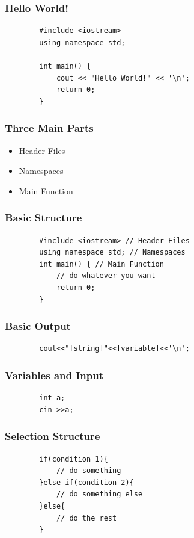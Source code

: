 \documentclass[xcolor=dvipsnames]{beamer}
\begin{document}
    \begin{frame}[fragile]
        \frametitle{\href{https://zh.wikipedia.org/zh-tw/Hello_Worldtext}{Hello World!}}
        \begin{verbatim}
        #include <iostream>
        using namespace std;

        int main() {
            cout << "Hello World!" << '\n';
            return 0;
        }
        \end{verbatim}
    \end{frame}

    \begin{frame}
        \frametitle{Three Main Parts}
        \begin{itemize}
            \item Header Files
            \item Namespaces
            \item Main Function
        \end{itemize}
    \end{frame}

    \begin{frame}[fragile]
        \frametitle{Basic Structure}
        \begin{verbatim}
        #include <iostream> // Header Files
        using namespace std; // Namespaces
        int main() { // Main Function
            // do whatever you want
            return 0;
        }
        \end{verbatim}
    \end{frame}

    \begin{frame}[fragile]
        \frametitle{Basic Output}
        \begin{verbatim}
        cout<<"[string]"<<[variable]<<'\n';
        \end{verbatim}
    \end{frame}

    \begin{frame}[fragile]
        \frametitle{Variables and Input}
        \begin{verbatim}
        int a;
        cin >>a;
        \end{verbatim}
    \end{frame}

    \begin{frame}[fragile]
        \frametitle{Selection Structure}
        \begin{verbatim}
        if(condition 1){
            // do something
        }else if(condition 2){
            // do something else
        }else{
            // do the rest
        }
        \end{verbatim}
    \end{frame}
\end{document}
